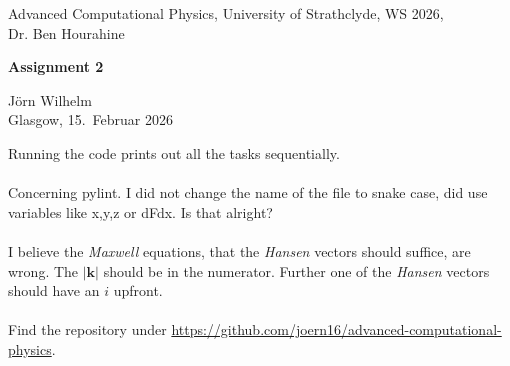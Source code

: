 \documentclass[english, 10pt,a4paper,oneside,headinclude,footinclude,BCOR5mm]{scrartcl}
\begin{document}
\renewcommand{\sectionmark}[1]{\markright{\spacedlowsmallcaps{#1}}} 
\lehead{\mbox{\llap{\small\thepage\kern1em\color{halfgray} \vline}\color{halfgray}\hspace{0.5em}\rightmark\hfil}} 
\pagestyle{plain} 


\begin{center}
    \large Advanced Computational Physics, University of Strathclyde, WS 2026,\\ Dr. Ben Hourahine

    \vspace{0.5cm}

    {\LARGE\bfseries Assignment 2\par}

    \vspace{0.5cm}

    \large Jörn Wilhelm\\
    Glasgow, 15.\ Februar 2026

    \vspace{1cm}
\end{center}

\newcommand{\cancelblue}[2]{
  \textcolor{blue}{\cancelto{#1}{\textcolor{black}{#2}}}
}
\newcommand{\overblue}[2]{
  \textcolor{blue}{\overbrace{\textcolor{black}{#2}}^{#1}}
}
\newcommand{\underblue}[2]{
  \textcolor{blue}{\underbrace{\textcolor{black}{#2}}_{#1}}
}
\newcommand{\blue}[1]{\textcolor{blue}{#1}}
\newcommand{\red}[1]{\textcolor{red}{#1}}


\noindent
Running the code prints out all the tasks sequentially. 
\\\\
Concerning pylint. I did not change the name of the file to snake case, did use variables like x,y,z or dFdx. Is that alright?
\\\\
I believe the \textit{Maxwell} equations, that the \textit{Hansen} vectors should suffice, are wrong. The $|\mathbf{k}|$ should be in the numerator.
Further one of the \textit{Hansen} vectors should have an $i$ upfront. 
\\\\
Find the repository under \url{https://github.com/joern16/advanced-computational-physics}.


%

\end{document}
